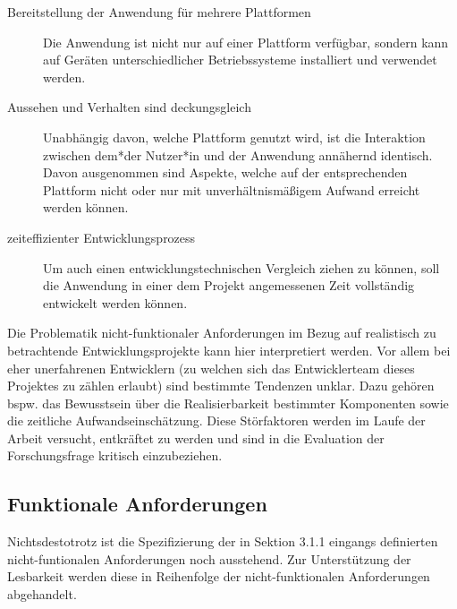 \begin{description}
    \item[Bereitstellung der Anwendung für mehrere Plattformen] Die Anwendung ist nicht nur auf einer Plattform verfügbar, sondern kann auf Geräten unterschiedlicher Betriebssysteme installiert und verwendet werden.
    \item[Aussehen und Verhalten sind deckungsgleich] Unabhängig davon, welche Plattform genutzt wird, ist die Interaktion zwischen dem*der Nutzer*in und der Anwendung annähernd identisch. Davon ausgenommen sind Aspekte, welche auf der entsprechenden Plattform nicht oder nur mit unverhältnismäßigem Aufwand erreicht werden können.
    \item[zeiteffizienter Entwicklungsprozess] Um auch einen entwicklungstechnischen Vergleich ziehen zu können, soll die Anwendung in einer dem Projekt angemessenen Zeit vollständig entwickelt werden können.
\end{description}
Die Problematik nicht-funktionaler Anforderungen im Bezug auf realistisch zu betrachtende Entwicklungsprojekte kann hier interpretiert werden. Vor allem bei eher unerfahrenen Entwicklern (zu welchen sich das Entwicklerteam dieses Projektes zu zählen erlaubt) sind bestimmte Tendenzen unklar. Dazu gehören bspw. das Bewusstsein über die Realisierbarkeit bestimmter Komponenten sowie die zeitliche Aufwandseinschätzung. Diese Störfaktoren werden im Laufe der Arbeit versucht, entkräftet zu werden und sind in die Evaluation der Forschungsfrage kritisch einzubeziehen.

\subsection{Funktionale Anforderungen}
Nichtsdestotrotz ist die Spezifizierung der in Sektion 3.1.1 eingangs definierten nicht-funtionalen Anforderungen noch ausstehend. Zur Unterstützung der Lesbarkeit werden diese in Reihenfolge der nicht-funktionalen Anforderungen abgehandelt.

